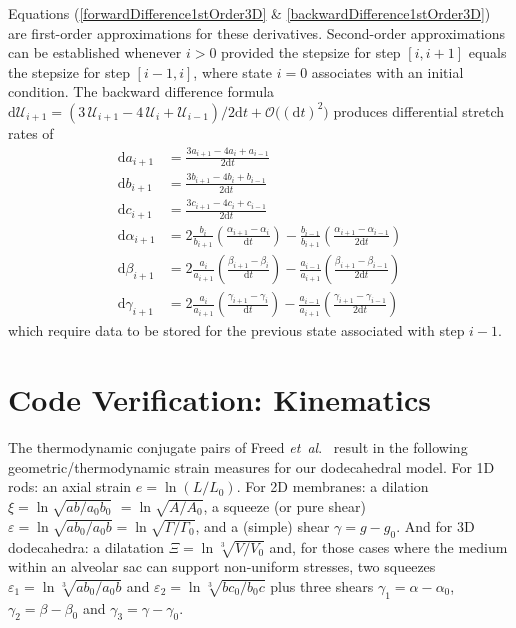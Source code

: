 Equations (\ref{forwardDifference1stOrder3D} \& \ref{backwardDifference1stOrder3D}) are first-order approximations for these derivatives.  Second-order approximations can be established whenever $i > 0$ provided the stepsize for step $[i, i+1]$ equals the stepsize for step $[i-1, i]$, where state $i=0$ associates with an initial condition.  The backward difference formula  $\mathrm{d} \boldsymbol{\mathcal{U}}_{i+1} = ( 3 \, \boldsymbol{\mathcal{U}}_{i+1} -  4 \, \boldsymbol{\mathcal{U}}_i + \boldsymbol{\mathcal{U}}_{i-1} ) / 2\mathrm{d}t + \mathcal{O} \bigl( ( \mathrm{d}t )^2 \bigr)$ produces differential stretch rates of
\begin{equation}
\begin{aligned}
\mathrm{d} a_{i+1} & 
= \frac {3a_{i+1} - 4a_i +  a_{i-1}}{2\mathrm{d}t} \\ 
\mathrm{d} b_{i+1} & 
= \frac {3b_{i+1} - 4b_i +  b_{i-1}}{2\mathrm{d}t} \\
\mathrm{d} c_{i+1} & 
= \frac {3c_{i+1} - 4c_i +  c_{i-1}}{2\mathrm{d}t} \\
\mathrm{d} \alpha_{i+1} & 
= 2 \frac{b_i} {b_{i+1}} \left( \frac{\alpha_{i+1} - \alpha_i}{\mathrm{d}t} \right) - \frac{b_{i-1}} {b_{i+1}} \left( \frac{\alpha_{i+1} - \alpha_{i-1}}{2\mathrm{d}t} \right) \\
\mathrm{d} \beta_{i+1} & 
= 2 \frac{a_i}{a_{i+1}} \left( \frac{\beta_{i+1} - \beta_i }{\mathrm{d}t} \right) - \frac{a_{i-1}} {a_{i+1}} \left( \frac{\beta_{i+1} - \beta_{i-1}}{2\mathrm{d}t} \right) \\ 
\mathrm{d} \gamma_{i+1} & 
= 2 \frac{a_i} {a_{i+1}} \left(\frac{\gamma_{i+1} - \gamma_i}{\mathrm{d}t} \right) - \frac{a_{i-1}}{a_{i+1}} \left( \frac{\gamma_{i+1} - \gamma_{i-1}}{2\mathrm{d}t} \right) 
\end{aligned}
\label{backwardDifference2ndOrder3D}
\end{equation}
which require data to be stored for the previous state associated with step $i-1$.


\section{Code Verification: Kinematics}
\label{sec:verification}

The thermodynamic conjugate pairs of Freed \textit{et~al}.\ \cite{Freed17,Freedetal17,FreedZamani19} result in the following geometric/thermo\-dynamic strain measures for our dodecahedral model.  For 1D rods: an axial strain $e = \ln ( L / L_0 )$.  For 2D membranes: a dilation $\xi = \ln \sqrt{ab/a_0b_0}$ $= \ln \sqrt{A/A_0}$, a squeeze (or pure shear) $\varepsilon = \ln \sqrt{ab_0/a_0b} = \ln \sqrt{\Gamma / \Gamma_0}$, and a (simple) shear $\gamma = g - g_0$.  And for 3D dodecahedra: a dilatation $\Xi = \ln \sqrt[3]{V \! / V_0}$ and, for those cases where the medium within an alveolar sac can support non-uniform stresses, two squeezes $\varepsilon_1 = \ln \sqrt[3]{a b_0 / a_0 b}$ and $\varepsilon_2 = \ln \sqrt[3]{b c_0 / b_0 c}$ plus three shears $\gamma_1 = \alpha - \alpha_0$, $\gamma_2 = \beta - \beta_0$ and $\gamma_3 = \gamma - \gamma_0$. 

